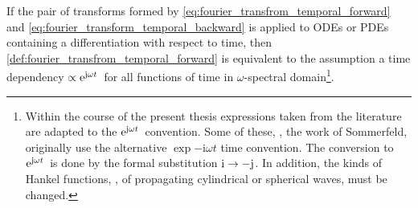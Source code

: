 \begin{remark}\label{rem:time_convention}
	If the pair of transforms formed by
	\eqref{eq:fourier_transfrom_temporal_forward} and
	\eqref{eq:fourier_transform_temporal_backward} is applied to \acp{ODE}
	or \acp{PDE} containing a differentiation with respect to time, then
	\cref{def:fourier_transfrom_temporal_forward} is equivalent to the
	assumption a time dependency $\propto\mathrm{e}^{\mathrm{j} \omega t}\,$ for all
	functions of time in $\omega$-spectral domain\footnote{Within the course of
	the present thesis expressions taken from the literature are adapted to the
	$\mathrm{e}^{\mathrm{j} \omega t}\,$ convention. Some of these, \eg, the work of
	Sommerfeld, originally use the alternative $\exp{-\mathrm{i} \omega t}$
	time convention.
	The conversion to $\mathrm{e}^{\mathrm{j} \omega t}\,$ is done by the formal substitution
	$\mathrm{i} \to -\mathrm{j}$. In addition, the kinds of Hankel functions, \ie,
	of propagating cylindrical or spherical waves, must be changed.}.
\end{remark}


